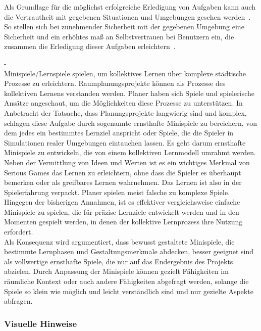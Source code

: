 
Als Grundlage für die möglichst erfolgreiche Erledigung von Aufgaben kann auch die Vertrautheit mit gegebenen Situationen und Umgebungen gesehen werden~\cite{scott1966activation}. So stellen sich bei zunehmender Sicherheit mit der gegebenen Umgebung eine Sicherheit und ein erhöhtes maß an Selbstvertrauen bei Benutzern ein, die zusammen die Erledigung dieser Aufgaben erleichtern~\cite{scott1966activation}. 

-\cite{devisch2018mini}\\
Minispiele/Lernspiele spielen, um kollektives Lernen über komplexe städtische Prozesse zu erleichtern. Raumplanungsprojekte können als Prozesse des kollektiven Lernens verstanden werden. Planer haben sich Spiele und spielerische Ansätze angeschaut, um die Möglichkeiten diese Prozesse zu unterstützen. In Anbetracht der Tatsache, dass Planungsprojekte langwierig sind und komplex, schlagen diese Aufgabe durch sogenannte ernsthafte Minispiele zu bereichern, von dem jedes ein bestimmtes Lernziel anspricht oder Spiele, die die Spieler in Simulationen realer Umgebungen eintauchen lassen. Es geht darum ernsthafte Minispiele zu entwickeln, die von einem kollektiven Lernmodell umrahmt werden.\\ 
Neben der Vermittlung von Ideen und Werten ist es ein wichtiges Merkmal von Serious Games das Lernen zu erleichtern, ohne dass die Spieler es überhaupt bemerken oder als greifbares Lernen wahrnehmen. Das Lernen ist also in der Spielerfahrung verpackt. Planer spielen meist falsche zu komplexe Spiele. Hingegen der bisherigen Annahmen, ist es effektiver vergleichsweise einfache Minispiele zu spielen, die für präzise Lernziele entwickelt werden und in den Momenten gespielt werden, in denen der kollektive Lernprozess ihre Nutzung erfordert.\\
Als Konsequenz wird argumentiert, dass bewusst gestaltete Minispiele, die bestimmte Lernphasen und Gestaltungsmerkmale abdecken, besser geeignet sind als vollwertige ernsthafte Spiele, die nur auf das Endergebnis des Projekts abzielen. Durch Anpassung der Minispiele können gezielt Fähigkeiten im räumliche Kontext oder auch andere Fähigkeiten abgefragt werden, solange die Spiele so klein wie möglich und leicht verständlich sind und nur gezielte Aspekte abfragen.

\subsubsection{Visuelle Hinweise}

